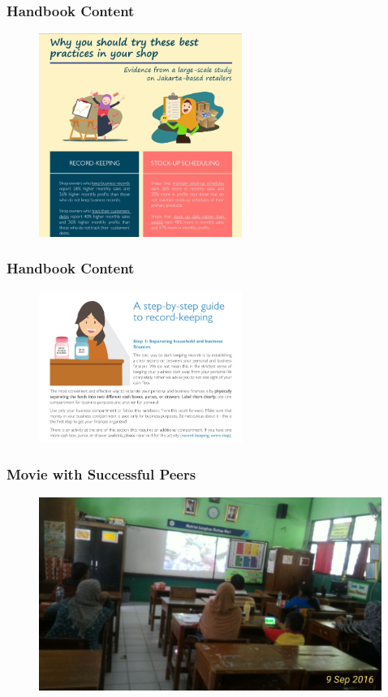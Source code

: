 \documentclass[hideothersubsections, usenames,dvipsnames,10pt]{beamer}
\begin{document}
\begin{frame}
\frametitle{Handbook Content}
\begin{figure}[htbp]
	\centering
		\includegraphics[width=2.6in]{pics/Handbook_return.jpg}
	
	\label{height}
\end{figure}
\end{frame}


\begin{frame}
\frametitle{Handbook Content}

\begin{figure}[htbp]
	\centering
		\includegraphics[width=2.6in]{pics/Handbook_stepbystep.jpg}
	
	\label{height}
\end{figure}
\end{frame}

\begin{frame}
\frametitle{Movie with Successful Peers}
\begin{figure}[htbp]
	\centering
		\includegraphics[width=4.4in]{pics/movie.jpg}
   
	\label{height}
\end{figure}
\end{frame}
\end{document}
